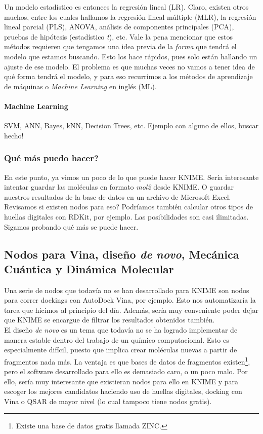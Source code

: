 \documentclass[10pt,letterpaper]{article}
\begin{document}
Un modelo estad\'istico es entonces la regresi\'on lineal (LR). Claro, existen otros muchos, entre los cuales hallamos la regresi\'on lineal m\'ultiple (MLR), la regresi\'on lineal parcial (PLS), ANOVA, an\'alisis de componentes principales (PCA), pruebas de hip\'otesis (estad\'istico \emph{t}), etc. Vale la pena mencionar que estos m\'etodos requieren que tengamos una idea previa de la \textit{forma} que tendr\'a el modelo que estamos buscando. Esto los hace r\'apidos, pues solo est\'an hallando un ajuste de ese modelo. El problema es que muchas veces no vamos a tener idea de qu\'e forma tendr\'a el modelo, y para eso recurrimos a los m\'etodos de aprendizaje de m\'aquinas o \emph{Machine Learning} en ingl\'es (ML).

\paragraph{Machine Learning}

SVM, ANN, Bayes, kNN, Decision Trees, etc.
Ejemplo con alguno de ellos, buscar hecho!

\subsubsection{Qu\'e m\'as puedo hacer?}
En este punto, ya vimos un poco de lo que puede hacer KNIME. Ser\'ia interesante intentar guardar las mol\'eculas en formato \emph{mol2} desde KNIME. O guardar nuestros resultados de la base de datos en un archivo de Microsoft Excel. Revisamos si existen nodos para eso? Podr\'iamos tambi\'en calcular otros tipos de huellas digitales con RDKit, por ejemplo. Las posibilidades son casi ilimitadas. Sigamos probando qu\'e m\'as se puede hacer.

\subsection{Nodos para Vina, dise\~no \emph{de novo}, Mec\'anica Cu\'antica y Din\'amica Molecular}
Una serie de nodos que todav\'ia no se han desarrollado para KNIME son nodos para correr dockings con AutoDock Vina, por ejemplo. Esto nos automatizar\'ia la tarea que hicimos al principio del d\'ia. Adem\'as, ser\'ia muy conveniente poder dejar que KNIME se encargue de filtrar los resultados obtenidos tambi\'en.\\

El dise\~no \emph{de novo} es un tema que todav\'ia no se ha logrado implementar de manera estable dentro del trabajo de un qu\'imico computacional. Esto es especialmente dif\'icil, puesto que implica crear mol\'eculas nuevas a partir de fragmentos nada m\'as. La ventaja es que bases de datos de fragmentos existen\footnote{Existe una base de datos gratis llamada ZINC.}, pero el software desarrollado para ello es demasiado caro, o un poco malo. Por ello, ser\'ia muy interesante que existieran nodos para ello en KNIME y para escoger los mejores candidatos haciendo uso de huellas digitales, docking con Vina o QSAR de mayor nivel (lo cual tampoco tiene nodos gratis).\\
\end{document}
